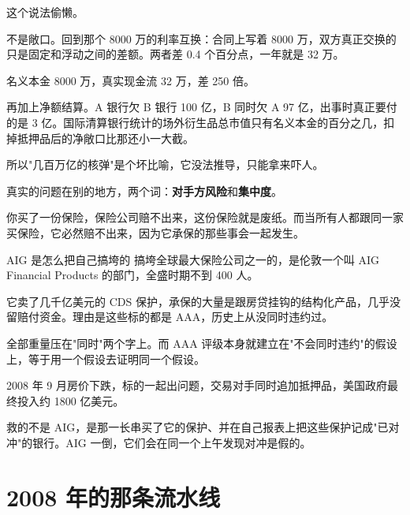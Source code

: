 这个说法偷懒。

不是敞口。回到那个 8000 万的利率互换：合同上写着 8000 万，双方真正交换的只是固定和浮动之间的差额。两者差 0.4 个百分点，一年就是 32 万。

名义本金 8000 万，真实现金流 32 万，差 250 倍。

再加上净额结算。A 银行欠 B 银行 100 亿，B 同时欠 A 97 亿，出事时真正要付的是 3 亿。国际清算银行统计的场外衍生品总市值只有名义本金的百分之几，扣掉抵押品后的净敞口比那还小一大截。

所以"几百万亿的核弹"是个坏比喻，它没法推导，只能拿来吓人。

真实的问题在别的地方，两个词：\textbf{对手方风险}和\textbf{集中度}。

你买了一份保险，保险公司赔不出来，这份保险就是废纸。而当所有人都跟同一家买保险，它必然赔不出来，因为它承保的那些事会一起发生。

\begin{egbox}{AIG 是怎么把自己搞垮的}
搞垮全球最大保险公司之一的，是伦敦一个叫 AIG Financial Products 的部门，全盛时期不到 400 人。

它卖了几千亿美元的 CDS 保护，承保的大量是跟房贷挂钩的结构化产品，几乎没留赔付资金。理由是这些标的都是 AAA，历史上从没同时违约过。

全部重量压在"同时"两个字上。而 AAA 评级本身就建立在"不会同时违约"的假设上，等于用一个假设去证明同一个假设。

2008 年 9 月房价下跌，标的一起出问题，交易对手同时追加抵押品，美国政府最终投入约 1800 亿美元。

救的不是 AIG，是那一长串买了它的保护、并在自己报表上把这些保护记成"已对冲"的银行。AIG 一倒，它们会在同一个上午发现对冲是假的。

\end{egbox}

\section{2008 年的那条流水线}

\begin{flowlist}
\end{flowlist}

